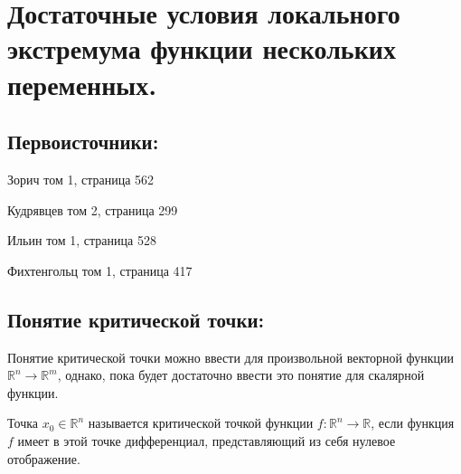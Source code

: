 \section{Достаточные условия локального экстремума функции нескольких переменных.}
\subsection{Первоисточники:}
\parindent=0cm
Зорич том 1, страница 562

Кудрявцев том 2, страница 299

Ильин том 1, страница 528

Фихтенгольц том 1, страница 417

\subsection{Понятие критической точки:}

Понятие критической точки можно ввести для произвольной векторной функции $\mathbb{R}^n \to \mathbb{R}^m$, однако, пока будет достаточно ввести это понятие для скалярной функции. 

\begin{definition}
Точка $x_0 \in \mathbb{R}^n$ называется критической точкой функции $f: \mathbb{R}^n \to \mathbb{R}$, если функция $f$ имеет в этой точке дифференциал, представляющий из себя нулевое отображение.
\end{definition}

